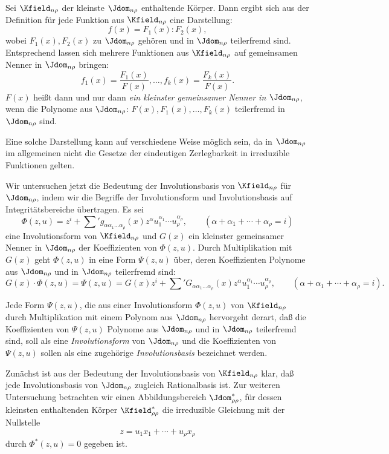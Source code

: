 \documentclass[11pt]{article}
\begin{document}
Sei $\Kfield_{n\rho}$ der kleinste $\Jdom_{n\rho}$ enthaltende Körper. Dann ergibt sich aus der Definition für jede Funktion aus $\Kfield_{n\rho}$ eine Darstellung:
\[
  f(x)=F_1(x):F_2(x),
\]
wobei $F_1(x),F_2(x)$ zu $\Jdom_{n\rho}$ gehören und in $\Jdom_{n\rho}$ teilerfremd sind. Entsprechend lassen sich mehrere Funktionen aus $\Kfield_{n\rho}$ auf gemeinsamen Nenner in $\Jdom_{n\rho}$ bringen:
\[
  f_1(x)=\frac{F_1(x)}{F(x)},\ldots,
  f_k(x)=\frac{F_k(x)}{F(x)}.
\]
$F(x)$ heißt dann und nur dann \emph{ein kleinster gemeinsamer Nenner in $\Jdom_{n\rho}$}, wenn die Polynome aus $\Jdom_{n\rho}$: $F(x),F_1(x),\ldots,F_k(x)$ teilerfremd in $\Jdom_{n\rho}$ sind.

Eine solche Darstellung kann auf verschiedene Weise möglich sein, da in $\Jdom_{n\rho}$ im allgemeinen nicht die Gesetze der eindeutigen Zerlegbarkeit in irreduzible Funktionen gelten.

Wir untersuchen jetzt die Bedeutung der Involutionsbasis von $\Kfield_{n\rho}$ für $\Jdom_{n\rho}$, indem wir die Begriffe der Involutionsform und Involutionsbasis auf Integritätsbereiche übertragen. Es sei
\[
  \Phi(z,u)=z^i+\sum{}' g_{\alpha\alpha_1\ldots\alpha_\rho}(x)
  z^\alpha u_1^{\alpha_1}\cdots u_\rho^{\alpha_\rho},
  \qquad
  (\alpha+\alpha_1+\cdots+\alpha_\rho=i)
\]
eine Involutionsform von $\Kfield_{n\rho}$ und $G(x)$ ein kleinster gemeinsamer Nenner in $\Jdom_{n\rho}$ der Koeffizienten von $\Phi(z,u)$. Durch Multiplikation mit $G(x)$ geht $\Phi(z,u)$ in eine Form $\Psi(z,u)$ über, deren Koeffizienten Polynome aus $\Jdom_{n\rho}$ und in $\Jdom_{n\rho}$ teilerfremd sind:
\[
  G(x)\cdot\Phi(z,u)=\Psi(z,u)
  =G(x)z^i+
  \sum{}' G_{\alpha\alpha_1\ldots\alpha_\rho}(x)
  z^\alpha u_1^{\alpha_1}\cdots u_\rho^{\alpha_\rho},
  \qquad
  (\alpha+\alpha_1+\cdots+\alpha_\rho=i).
\]

Jede Form $\Psi(z,u)$, die aus einer Involutionsform $\Phi(z,u)$ von $\Kfield_{n\rho}$ durch Multiplikation mit einem Polynom aus $\Jdom_{n\rho}$ hervorgeht derart, daß die Koeffizienten von $\Psi(z,u)$ Polynome aus $\Jdom_{n\rho}$ und in $\Jdom_{n\rho}$ teilerfremd sind, soll als eine \emph{Involutionsform} von $\Jdom_{n\rho}$ und die Koeffizienten von $\Psi(z,u)$ sollen als eine zugehörige \emph{Involutionsbasis} bezeichnet werden.

Zunächst ist aus der Bedeutung der Involutionsbasis von $\Kfield_{n\rho}$ klar, daß jede Involutionsbasis von $\Jdom_{n\rho}$ zugleich Rationalbasis ist. Zur weiteren Untersuchung betrachten wir einen Abbildungsbereich $\Jdom^*_{\rho\rho}$, für dessen kleinsten enthaltenden Körper $\Kfield^*_{\rho\rho}$ die irreduzible Gleichung mit der Nullstelle
\[
  z=u_1x_1+\cdots+u_\rho x_\rho
\]
durch $\Phi^*(z,u)=0$ gegeben ist.
\end{document}
